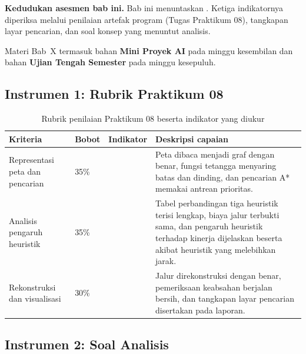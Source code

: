 \label{sec:asesmen-astar}

\begin{asesmenbox}
\textbf{Kedudukan asesmen bab ini.} Bab ini menuntaskan .
Ketiga indikatornya diperiksa melalui penilaian artefak program (Tugas
Praktikum 08), tangkapan layar pencarian, dan soal konsep yang menuntut
analisis.

\vspace{0.4em}
Materi Bab~X termasuk bahan \textbf{Mini Proyek AI} pada minggu kesembilan dan
bahan \textbf{Ujian Tengah Semester} pada minggu kesepuluh.
\end{asesmenbox}

\subsection*{Instrumen 1: Rubrik Praktikum 08}

\begin{table}[htbp]
\centering
\caption{Rubrik penilaian Praktikum 08 beserta indikator yang diukur}
\label{tab:rubrik-praktikum-08}
{\setlength{\tabcolsep}{4pt}\footnotesize%
\begin{tabularx}{\textwidth}{@{}L{3.2cm} C{1.3cm} C{2.1cm} Y@{}}
\toprule
\headrow \textbf{Kriteria} & \textbf{Bobot} & \textbf{Indikator} & \textbf{Deskripsi capaian} \\
\midrule
Representasi peta dan pencarian & 35\% &  &
Peta dibaca menjadi graf dengan benar, fungsi tetangga menyaring batas dan
dinding, dan pencarian A* memakai antrean prioritas. \\
\addlinespace
Analisis pengaruh heuristik & 35\% &  &
Tabel perbandingan tiga heuristik terisi lengkap, biaya jalur terbukti sama,
dan pengaruh heuristik terhadap kinerja dijelaskan beserta akibat heuristik
yang melebihkan jarak. \\
\addlinespace
Rekonstruksi dan visualisasi & 30\% &  &
Jalur direkonstruksi dengan benar, pemeriksaan keabsahan berjalan bersih, dan
tangkapan layar pencarian disertakan pada laporan. \\
\bottomrule
\end{tabularx}}
\end{table}

\subsection*{Instrumen 2: Soal Analisis}

